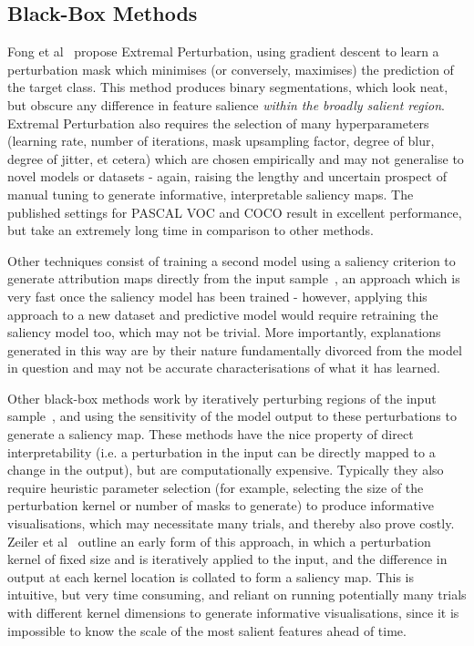 \documentclass{article} %
\begin{document}
\subsection{Black-Box Methods}

Fong et al~\cite{Fong2017-jg} propose Extremal Perturbation, using gradient descent to learn a perturbation mask which minimises (or conversely, maximises) the prediction of the target class. This method produces binary segmentations, which look neat, but obscure any difference in feature salience \emph{within the broadly salient region}. Extremal Perturbation also requires the selection of many hyperparameters (learning rate, number of iterations, mask upsampling factor, degree of blur, degree of jitter, et cetera) which are chosen empirically and may not generalise to novel models or datasets - again, raising the lengthy and uncertain prospect of manual tuning to generate informative, interpretable saliency maps. The published settings for PASCAL VOC and COCO result in excellent performance, but take an extremely long time in comparison to other methods. 

Other techniques consist of training a second model using a saliency criterion to generate attribution maps directly from the input sample~\cite{Ribeiro2016-xl, Dabkowski2017-td}, an approach which is very fast once the saliency model has been trained - however, applying this approach to a new dataset and predictive model would require retraining the saliency model too, which may not be trivial. More importantly, explanations generated in this way are by their nature fundamentally divorced from the model in question and may not be accurate characterisations of what it has learned. 

Other black-box methods work by iteratively perturbing regions of the input sample~\cite{Petsiuk2018-wx, Zeiler2013-lm}, and using the sensitivity of the model output to these perturbations to generate a saliency map. These methods have the nice property of direct interpretability (i.e. a perturbation in the input can be directly mapped to a change in the output), but are computationally expensive. Typically they also require heuristic parameter selection (for example, selecting the size of the perturbation kernel or number of masks to generate) to produce informative visualisations, which may necessitate many trials, and thereby also prove costly. Zeiler et al~\cite{Zeiler2013-lm} outline an early form of this approach, in which a perturbation kernel of fixed size and is iteratively applied to the input, and the difference in output at each kernel location is collated to form a saliency map. This is intuitive, but very time consuming, and reliant on running potentially many trials with different kernel dimensions to generate informative visualisations, since it is impossible to know the scale of the most salient features ahead of time. 
\end{document}
